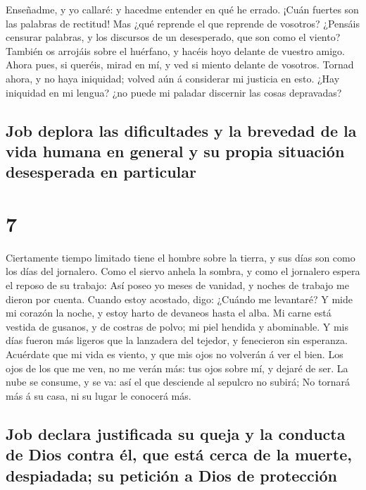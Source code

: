  Enseñadme, y yo callaré: y hacedme entender en qué he
errado.  ¡Cuán fuertes son las palabras de rectitud! Mas
¿qué reprende el que reprende de vosotros?  ¿Pensáis
censurar palabras, y los discursos de un desesperado, que son como el
viento?  También os arrojáis sobre el huérfano, y hacéis
hoyo delante de vuestro amigo.  Ahora pues, si queréis,
mirad en mí, y ved si miento delante de vosotros.  Tornad
ahora, y no haya iniquidad; volved aún á considerar mi justicia en esto.
 ¿Hay iniquidad en mi lengua? ¿no puede mi paladar
discernir las cosas depravadas?

\hypertarget{job-deplora-las-dificultades-y-la-brevedad-de-la-vida-humana-en-general-y-su-propia-situaciuxf3n-desesperada-en-particular}{%
\subsection{Job deplora las dificultades y la brevedad de la vida humana
en general y su propia situación desesperada en
particular}\label{job-deplora-las-dificultades-y-la-brevedad-de-la-vida-humana-en-general-y-su-propia-situaciuxf3n-desesperada-en-particular}}

\hypertarget{section-6}{%
\section{7}\label{section-6}}

 Ciertamente tiempo limitado tiene el hombre sobre la
tierra, y sus días son como los días del jornalero.  Como el
siervo anhela la sombra, y como el jornalero espera el reposo de su
trabajo:  Así poseo yo meses de vanidad, y noches de trabajo
me dieron por cuenta.  Cuando estoy acostado, digo: ¿Cuándo
me levantaré? Y mide mi corazón la noche, y estoy harto de devaneos
hasta el alba.  Mi carne está vestida de gusanos, y de
costras de polvo; mi piel hendida y abominable.  Y mis días
fueron más ligeros que la lanzadera del tejedor, y fenecieron sin
esperanza.  Acuérdate que mi vida es viento, y que mis ojos
no volverán á ver el bien.  Los ojos de los que me ven, no
me verán más: tus ojos sobre mí, y dejaré de ser.  La nube
se consume, y se va: así el que desciende al sepulcro no subirá;
 No tornará más á su casa, ni su lugar le conocerá más.

\hypertarget{job-declara-justificada-su-queja-y-la-conducta-de-dios-contra-uxe9l-que-estuxe1-cerca-de-la-muerte-despiadada-su-peticiuxf3n-a-dios-de-protecciuxf3n}{%
\subsection{Job declara justificada su queja y la conducta de Dios
contra él, que está cerca de la muerte, despiadada; su petición a Dios
de
protección}\label{job-declara-justificada-su-queja-y-la-conducta-de-dios-contra-uxe9l-que-estuxe1-cerca-de-la-muerte-despiadada-su-peticiuxf3n-a-dios-de-protecciuxf3n}}


